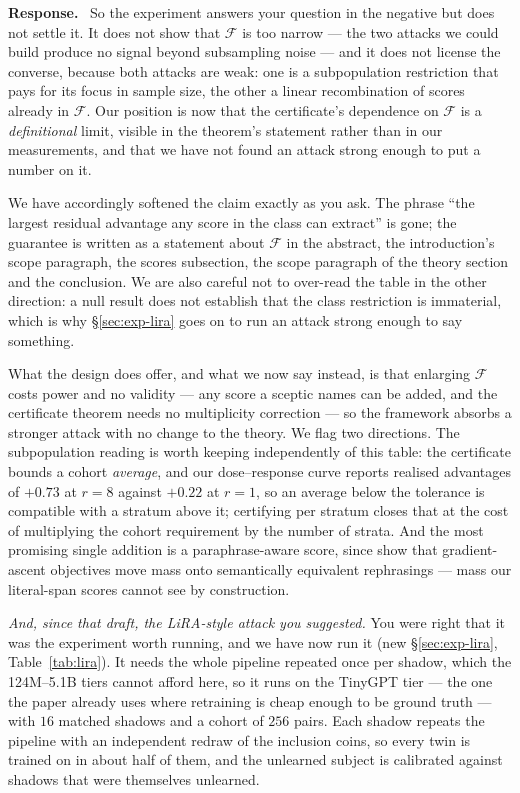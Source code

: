 \documentclass[11pt,a4paper]{article}
\newcommand{\F}{\mathcal{F}}
\newenvironment{reply}{%
  \par\smallskip\noindent\textbf{\color{acol}Response.}\ \begingroup}{\endgroup\par}
\begin{document}
\begin{reply}
So the experiment answers your question in the negative but does not settle it. It does
not show that $\F$ is too narrow --- the two attacks we could build produce no signal
beyond subsampling noise --- and it does not license the converse, because both attacks
are weak: one is a subpopulation restriction that pays for its focus in sample size,
the other a linear recombination of scores already in $\F$. Our position is now that
the certificate's dependence on $\F$ is a \emph{definitional} limit, visible in the
theorem's statement rather than in our measurements, and that we have not found an
attack strong enough to put a number on it.

We have accordingly softened the claim exactly as you ask. The phrase ``the largest
residual advantage any score in the class can extract'' is gone; the guarantee is
written as a statement about $\F$ in the abstract, the introduction's scope paragraph,
the scores subsection, the scope paragraph of the theory section and the conclusion.
We are also careful not to over-read the table in the other direction: a null result
does not establish that the class restriction is immaterial, which is why
\S\ref{sec:exp-lira} goes on to run an attack strong enough to say something.

What the design does offer, and what we now say instead, is that enlarging $\F$ costs
power and no validity --- any score a sceptic names can be added, and the certificate
theorem needs no multiplicity correction --- so the framework absorbs a stronger attack
with no change to the theory. We flag two directions. The subpopulation reading is
worth keeping independently of this table: the certificate bounds a cohort
\emph{average}, and our dose--response curve reports realised advantages of $+0.73$ at
$r=8$ against $+0.22$ at $r=1$, so an average below the tolerance is compatible with a
stratum above it; certifying per stratum closes that at the cost of multiplying the
cohort requirement by the number of strata. And the most promising single addition is a
paraphrase-aware score, since \citet{li2026beliefs} show that gradient-ascent
objectives move mass onto semantically equivalent rephrasings --- mass our literal-span
scores cannot see by construction.

\medskip
\emph{And, since that draft, the LiRA-style attack you suggested.} You were right that
it was the experiment worth running, and we have now run it (new \S\ref{sec:exp-lira},
Table~\ref{tab:lira}). It needs the whole pipeline repeated once per shadow, which the
124M--5.1B tiers cannot afford here, so it runs on the TinyGPT tier --- the one the
paper already uses where retraining is cheap enough to be ground truth --- with $16$
matched shadows and a cohort of $256$ pairs. Each shadow repeats the pipeline with an
independent redraw of the inclusion coins, so every twin is trained on in about half
of them, and the unlearned subject is calibrated against shadows that were themselves
unlearned.


\end{reply}
\end{document}
